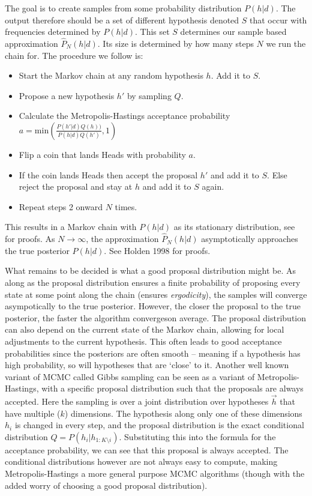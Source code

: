 The goal is to create samples from some probability distribution $P(h | d)$. The output therefore should be a set of different hypothesis denoted $S$ that occur with frequencies determined by $P(h | d)$. This set $S$ determines our sample based approximation $\hat{P}_N(h|d) $. Its size is determined by how many steps $N$ we run the chain for. The procedure we follow is:
\begin{itemize}
\item Start the Markov chain at any random hypothesis $h$. Add it to $S$.
\item Propose a new hypothesis $h'$ by sampling $Q$.
\item Calculate the Metropolis-Hastings acceptance probability $a = \text{min}\left( \frac{P(h' | d) Q(h))}{P(h | d) Q(h')}, 1 \right)$
\item Flip a coin that lands Heads with probability $a$.
\item If the coin lands Heads then accept the proposal $h'$ and add it to $S$. Else reject the proposal and stay at $h$ and add it to $S$ again.
\item Repeat steps 2 onward $N$ times.
\end{itemize}

This results in a Markov chain with $P(h|d)$ as its stationary distribution, see \citet{blitzstein2014introduction} for proofs. As  $N \rightarrow \infty$, the approximation $\hat{P}_N(h|d) $ asymptotically approaches the true posterior $P(h | d)$. See Holden 1998 \cite{holden1998geometric} for proofs.

What remains to be decided is what a good proposal distribution might be. As along as the proposal distribution ensures a finite probability of proposing every state at some point along the chain (ensures \textit{ergodicity}), the samples will converge asympotically to the true posterior. However, the closer the proposal to the true posterior, the faster the algorithm convergeson average\cite{holden1998geometric}. The proposal distribution can also depend on the current state of the Markov chain, allowing for local adjustments to the current hypothesis. This often leads to good acceptance probabilities since the posteriors are often smooth -- meaning if a hypothesis has high probability, so will hypotheses that are `close' to it. Another well known variant of MCMC called Gibbs sampling can be seen as a variant of Metropolis-Hastings, with a specific proposal distribution such that the proposals are always accepted. Here the sampling is over a joint distribution over hypotheses $\vec{h}$ that have multiple ($k$) dimensions. The hypothesis along only one of these dimensions $h_i$ is changed in every step, and the proposal distribution is the exact conditional distribution $Q = P(h_i | h_{1:K\setminus i})$. Substituting this into the formula for the acceptance probability, we can see that this proposal is always accepted. The conditional distributions however are not always easy to compute, making Metropolis-Hastings a more general purpose MCMC algorithms (though with the added worry of choosing a good proposal distribution).

